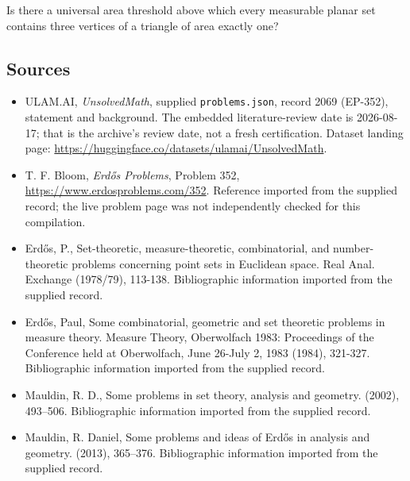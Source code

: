 \documentclass[11pt,a4paper]{article}
\begin{document}
Is there a universal area threshold above which every measurable planar set contains three vertices of a triangle of area exactly one?

\subsection{Sources}

{\small

\begin{itemize}

\item[\hypertarget{source:2069:1}{S1}] ULAM.AI, \emph{UnsolvedMath}, supplied \texttt{problems.json}, record 2069 (EP-352), statement and background. The embedded literature-review date is 2026-08-17; that is the archive’s review date, not a fresh certification. Dataset landing page: \url{https://huggingface.co/datasets/ulamai/UnsolvedMath}.

\item[\hypertarget{source:2069:2}{S2}] T. F. Bloom, \emph{Erdős Problems}, Problem 352, \url{https://www.erdosproblems.com/352}. Reference imported from the supplied record; the live problem page was not independently checked for this compilation.

\item[\hypertarget{source:2069:3}{S3}] Erd\H{o}s, P., Set-theoretic, measure-theoretic, combinatorial, and number-theoretic problems concerning point sets in Euclidean space. Real Anal. Exchange (1978/79), 113-138. Bibliographic information imported from the supplied record.

\item[\hypertarget{source:2069:4}{S4}] Erd\H{o}s, Paul, Some combinatorial, geometric and set theoretic problems in measure theory. Measure Theory, Oberwolfach 1983: Proceedings of the Conference held at Oberwolfach, June 26-July 2, 1983 (1984), 321-327. Bibliographic information imported from the supplied record.

\item[\hypertarget{source:2069:5}{S5}] Mauldin, R. D., Some problems in set theory, analysis and geometry. (2002), 493--506. Bibliographic information imported from the supplied record.

\item[\hypertarget{source:2069:6}{S6}] Mauldin, R. Daniel, Some problems and ideas of {E}rd\H{o}s in analysis and geometry. (2013), 365--376. Bibliographic information imported from the supplied record.

\end{itemize}

}

\label{end:2069}
\end{document}
